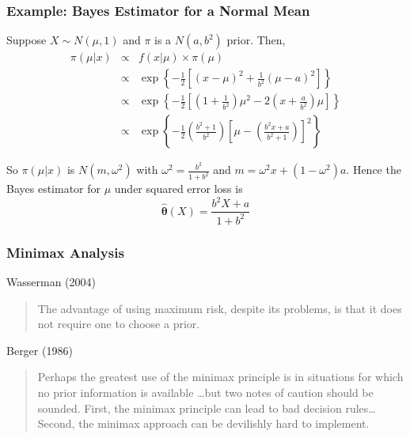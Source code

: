 \begin{frame}
  \frametitle{Example: Bayes Estimator for a Normal Mean}

  Suppose $X \sim N(\mu, 1)$ and $\pi$ is a $N(a, b^2)$ prior.
  Then,
  \footnotesize
  \begin{eqnarray*}
    \pi(\mu|x) &\propto& f(x|\mu) \times \pi(\mu)\\
    &\propto& \exp\left\{ -\frac{1}{2}\left[(x - \mu)^2  + \frac{1}{b^2}( \mu - a)^2\right]\right\} \\
    &\propto& \exp\left\{ -\frac{1}{2}\left[\left( 1 + \frac{1}{b^2} \right)\mu^2 - 2 \left( x + \frac{a}{b^2} \right)\mu\right]\right\} \\
    &\propto& \exp\left\{ -\frac{1}{2}\left( \frac{b^2 + 1}{b^2} \right)\left[\mu - \left( \frac{b^2 x + a}{b^2 + 1} \right)\right]^2\right\}
  \end{eqnarray*}
  \normalsize

  So $\pi(\mu|x)$ is $N(m, \omega^2)$ with $\omega^2 = \frac{b^2}{1 + b^2}$ and $m = \omega^2 x + (1 - \omega^2) a$.
  Hence the Bayes estimator for $\mu$ under squared error loss is 
  \[
    \boxed{\widehat{\mathbf{\theta}}(X) = \frac{b^2X + a}{1 + b^2}}
  \]

\end{frame}
\begin{frame}
  \frametitle{Minimax Analysis}

  \small

  \begin{block}{Wasserman (2004)}
  \begin{quote}
    The advantage of using maximum risk, despite its problems, is that it does not require one to choose a prior.
  \end{quote}
  \end{block}

  \begin{block}{Berger (1986)}
  \begin{quote}
    Perhaps the greatest use of the minimax principle is in situations for which no prior information is available \dots but two notes of caution should be sounded. 
    First, the minimax principle can lead to bad decision rules\dots Second, the minimax approach can be devilishly hard to implement.
  \end{quote}
  \end{block}
\end{frame}
